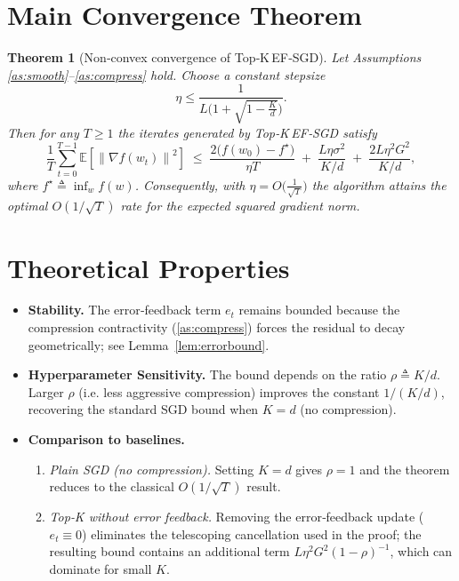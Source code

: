 \documentclass{article}
\newcommand{\EE}{\mathbb{E}}
\newcommand{\norm}[1]{\left\lVert #1 \right\rVert}
\newtheorem{theorem}{Theorem}
\begin{document}
\section*{Main Convergence Theorem}
\begin{theorem}[Non‑convex convergence of Top‑K EF‑SGD]\label{thm:main}
Let Assumptions \ref{as:smooth}–\ref{as:compress} hold. Choose a constant stepsize
\[
    \eta\le\frac{1}{L\big(1+\sqrt{1-\tfrac{K}{d}}\big)}.
\]
Then for any $T\ge1$ the iterates generated by Top‑K EF‑SGD satisfy
\[
\frac{1}{T}\sum_{t=0}^{T-1}\EE\!\left[\norm{\nabla f(w_t)}^{2}\right]
\;\le\;
\frac{2\big(f(w_{0})-f^{\star}\big)}{\eta T}
\;+\;
\frac{L\eta\sigma^{2}}{K/d}
\;+\;
\frac{2L\eta^{2}G^{2}}{K/d},
\]
where $f^{\star}\triangleq\inf_{w}f(w)$. Consequently, with $\eta=O\big(\tfrac{1}{\sqrt{T}}\big)$ the algorithm attains the optimal $O(1/\sqrt{T})$ rate for the expected squared gradient norm.
\end{theorem}

\section*{Theoretical Properties}
\begin{itemize}
    \item \textbf{Stability.} The error‑feedback term $e_t$ remains bounded because the compression contractivity (\ref{as:compress}) forces the residual to decay geometrically; see Lemma~\ref{lem:errorbound}.
    \item \textbf{Hyperparameter Sensitivity.} The bound depends on the ratio $\rho\triangleq K/d$. Larger $\rho$ (i.e. less aggressive compression) improves the constant $1/(K/d)$, recovering the standard SGD bound when $K=d$ (no compression). 
    \item \textbf{Comparison to baselines.}
        \begin{enumerate}[label=\alph*)]
            \item \emph{Plain SGD (no compression).} Setting $K=d$ gives $\rho=1$ and the theorem reduces to the classical $O(1/\sqrt{T})$ result.
            \item \emph{Top‑K without error feedback.} Removing the error‑feedback update ($e_t\equiv0$) eliminates the telescoping cancellation used in the proof; the resulting bound contains an additional term $L\eta^{2}G^{2}(1-\rho)^{-1}$, which can dominate for small $K$.
        \end{enumerate}
\end{itemize}
\end{document}
